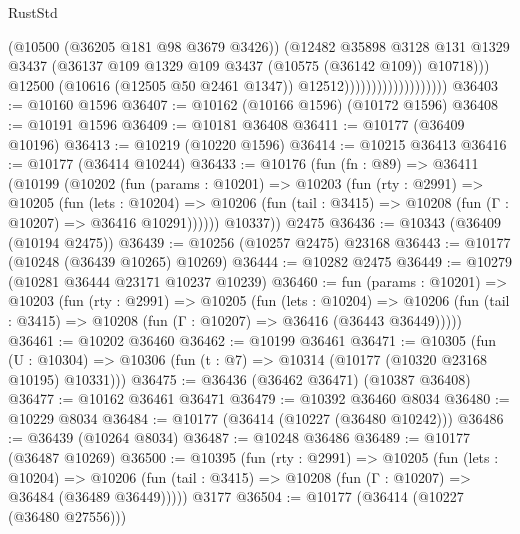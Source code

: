 \begin{lexlean}{RustStd}
\begin{coremodule}
                                            (@10500 (@36205 @181 @98 @3679 @3426))
                                            (@12482
                                              @35898
                                              @3128
                                              @131
                                              @1329
                                              @3437
                                              (@36137
                                                @109
                                                @1329
                                                @109
                                                @3437
                                                (@10575 (@36142 @109))
                                                @10718)))
                                          @12500
                                          (@10616 (@12505 @50 @2461 @1347))
                                          @12512)))))))))))))))))))
@36403 := @10160 @1596
@36407 := @10162 (@10166 @1596) (@10172 @1596)
@36408 := @10191 @1596
@36409 := @10181 @36408
@36411 := @10177 (@36409 @10196)
@36413 := @10219 (@10220 @1596)
@36414 := @10215 @36413
@36416 := @10177 (@36414 @10244)
@36433 := @10176
    (fun (fn : @89) =>
    @36411
      (@10199
        (@10202
          (fun (params : @10201) =>
          @10203
            (fun (rty : @2991) =>
            @10205
              (fun (lets : @10204) =>
              @10206 (fun (tail : @3415) => @10208 (fun (Γ : @10207) => @36416 @10291))))))
        @10337))
    @2475
@36436 := @10343 (@36409 (@10194 @2475))
@36439 := @10256 (@10257 @2475) @23168
@36443 := @10177 (@10248 (@36439 @10265) @10269)
@36444 := @10282 @2475
@36449 := @10279 (@10281 @36444 @23171 @10237 @10239)
@36460 := fun (params : @10201) =>
  @10203
    (fun (rty : @2991) =>
    @10205
      (fun (lets : @10204) =>
      @10206 (fun (tail : @3415) => @10208 (fun (Γ : @10207) => @36416 (@36443 @36449)))))
@36461 := @10202 @36460
@36462 := @10199 @36461
@36471 := @10305
    (fun (U : @10304) => @10306 (fun (t : @7) => @10314 (@10177 (@10320 @23168 @10195) @10331)))
@36475 := @36436 (@36462 @36471) (@10387 @36408)
@36477 := @10162 @36461 @36471
@36479 := @10392 @36460 @8034
@36480 := @10229 @8034
@36484 := @10177 (@36414 (@10227 (@36480 @10242)))
@36486 := @36439 (@10264 @8034)
@36487 := @10248 @36486
@36489 := @10177 (@36487 @10269)
@36500 := @10395
    (fun (rty : @2991) =>
    @10205
      (fun (lets : @10204) =>
      @10206 (fun (tail : @3415) => @10208 (fun (Γ : @10207) => @36484 (@36489 @36449)))))
    @3177
@36504 := @10177 (@36414 (@10227 (@36480 @27556)))

\end{coremodule}
\end{lexlean}
